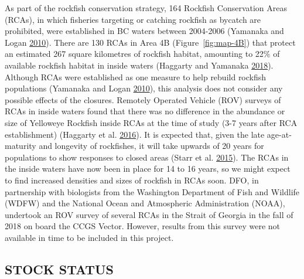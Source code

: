 \documentclass[11pt]{book}
\begin{document}
As part of the rockfish conservation strategy, 164 Rockfish Conservation Areas (RCAs), in which fisheries targeting or catching rockfish as bycatch are prohibited, were established in BC waters between 2004-2006 (Yamanaka and Logan \protect\hyperlink{ref-yamanaka2010}{2010}). There are 130 RCAs in Area 4B (Figure~\ref{fig:map-4B}) that protect an estimated 267 square kilometres of rockfish habitat, amounting to 22\% of available rockfish habitat in inside waters (Haggarty and Yamanaka \protect\hyperlink{ref-haggarty2018}{2018}). Although RCAs were established as one measure to help rebuild rockfish populations (Yamanaka and Logan \protect\hyperlink{ref-yamanaka2010}{2010}), this analysis does not consider any possible effects of the closures. Remotely Operated Vehicle (ROV) surveys of RCAs in inside waters found that there was no difference in the abundance or size of Yelloweye Rockfish inside RCAs at the time of study (3-7 years after RCA establishment) (Haggarty et al. \protect\hyperlink{ref-haggarty2016b}{2016}). It is expected that, given the late age-at-maturity and longevity of rockfishes, it will take upwards of 20 years for populations to show responses to closed areas (Starr et al. \protect\hyperlink{ref-starr2015}{2015}). The RCAs in the inside waters have now been in place for 14 to 16 years, so we might expect to find increased densities and sizes of rockfish in RCAs soon. DFO, in partnership with biologists from the Washington Department of Fish and Wildlife (WDFW) and the National Ocean and Atmospheric Administration (NOAA), undertook an ROV survey of several RCAs in the Strait of Georgia in the fall of 2018 on board the CCGS Vector. However, results from this survey were not available in time to be included in this project.

\hypertarget{sec:discussion-status}{%
\subsection{STOCK STATUS}\label{sec:discussion-status}}
\end{document}
